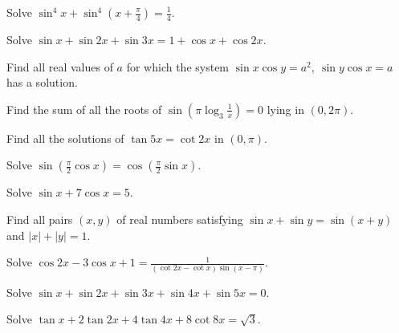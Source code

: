 \item Solve $\sin^4x + \sin^4\left(x + \frac{\pi}{4}\right) = \frac{1}{4}.$
\item Solve $\sin x + \sin2x + \sin3x = 1 + \cos x + \cos2x.$
\item Find all real values of $a$ for which the system $\sin x\cos y = a^2,~\sin y\cos x = a$ has a solution.
\item Find the sum of all the roots of $\sin\left(\pi\log_3\frac{1}{x}\right) = 0$ lying in $(0, 2\pi).$
\item Find all the solutions of $\tan5x = \cot2x$ in $(0, \pi).$
\item Solve $\sin\left(\frac{\pi}{2}\cos x\right) = \cos\left(\frac{\pi}{2}\sin x\right).$
\item Solve $\sin x + 7\cos x = 5.$
\item Find all pairs $(x, y)$ of real numbers satisfying $\sin x + \sin y = \sin(x + y)$ and $|x| + |y| = 1.$
\item Solve $\cos2x - 3\cos x + 1 = \frac{1}{(\cot2x - \cot x)\sin(x - \pi)}.$
\item Solve $\sin x + \sin2x + \sin3x + \sin4x + \sin5x = 0.$
\item Solve $\tan x + 2\tan2x + 4\tan4x + 8\cot8x = \sqrt{3}.$
\stopitemize
